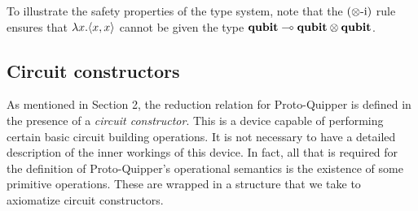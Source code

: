 \documentclass[twoside]{article}
\begin{document}
To illustrate the safety properties of the type system, 
note that the $(\otimes\mbox{-i})$ rule ensures that 
$\lambda x. \langle x,x\rangle$ cannot be given the type 
$\textrm{\bf qubit}\multimap \textrm{\bf qubit} \otimes \textrm{\bf qubit}$.


\subsection{Circuit constructors}

As mentioned in Section 2, the reduction relation for 
Proto-Quipper is defined in the presence of a \emph{circuit
constructor}. This is a device capable of 
performing certain basic circuit building operations. It is 
not necessary to have a detailed description of the inner 
workings of this device. In fact, all that is required for 
the definition of Proto-Quipper's operational semantics is 
the existence of some primitive operations. These are wrapped 
in a structure that we take to axiomatize circuit constructors. 
\end{document}
